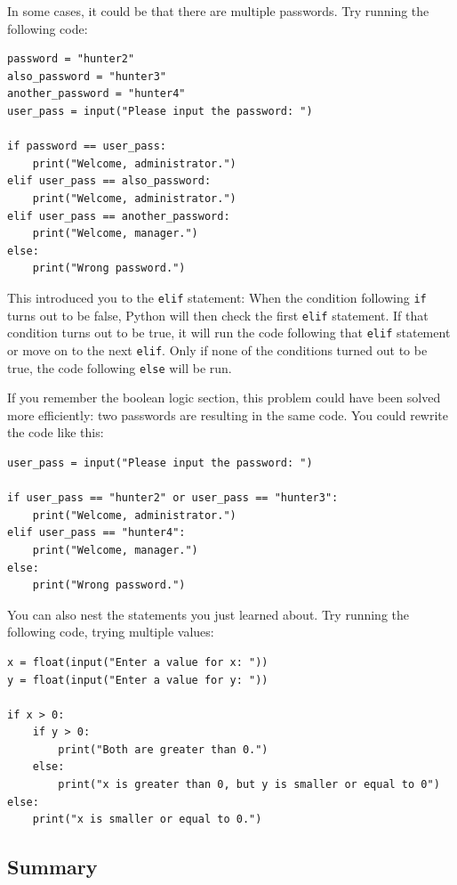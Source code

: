 \documentclass[11pt]{cselabheader}
\begin{document}
In some cases, it could be that there are multiple passwords. Try running the
following code:
\begin{lstlisting}
password = "hunter2"
also_password = "hunter3"
another_password = "hunter4"
user_pass = input("Please input the password: ")

if password == user_pass:
    print("Welcome, administrator.")
elif user_pass == also_password:
    print("Welcome, administrator.")
elif user_pass == another_password:
    print("Welcome, manager.")
else:
    print("Wrong password.")
\end{lstlisting}

This introduced you to the \lstinline!elif! statement: When the condition
following \lstinline!if! turns out to be false, Python will then check the first
\lstinline!elif! statement. If that condition turns out to be true, it will run
the code following that \lstinline!elif! statement or move on to the next
\lstinline!elif!. Only if none of the conditions turned out to be true, the code
following \lstinline!else! will be run.

If you remember the boolean logic section, this problem could have been solved
more efficiently: two passwords are resulting in the same code. You could
rewrite the code like this:
\begin{lstlisting}
user_pass = input("Please input the password: ")

if user_pass == "hunter2" or user_pass == "hunter3":
    print("Welcome, administrator.")
elif user_pass == "hunter4":
    print("Welcome, manager.")
else:
    print("Wrong password.")
\end{lstlisting}

You can also nest the statements you just learned about. Try running the
following code, trying multiple values:
\begin{lstlisting}
x = float(input("Enter a value for x: "))
y = float(input("Enter a value for y: "))

if x > 0:
    if y > 0:
        print("Both are greater than 0.")
    else:
        print("x is greater than 0, but y is smaller or equal to 0")
else:
    print("x is smaller or equal to 0.")
\end{lstlisting}

\subsection{Summary}
\end{document}
